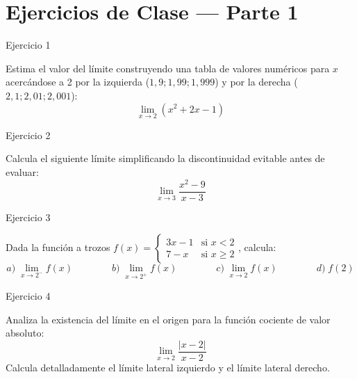 \documentclass[aspectratio=169]{beamer}
\begin{document}
\section{Ejercicios de Clase — Parte 1}

\begin{frame}{Ejercicio 1}
  \begin{mwejercicio}
    Estima el valor del límite construyendo una tabla de valores numéricos para $x$ acercándose a 2 por la izquierda ($1{,}9; 1{,}99; 1{,}999$) y por la derecha ($2{,}1; 2{,}01; 2{,}001$):
    $$\lim_{x \to 2} (x^2 + 2x - 1)$$
  \end{mwejercicio}
  \vspace{3.5cm}
\end{frame}
\begin{frame}{Ejercicio 2}
  \begin{mwejercicio}
    Calcula el siguiente límite simplificando la discontinuidad evitable antes de evaluar:
    $$\lim_{x \to 3} \frac{x^2 - 9}{x - 3}$$
  \end{mwejercicio}
  \vspace{3.5cm}
\end{frame}
\begin{frame}{Ejercicio 3}
  \begin{mwejercicio}
    Dada la función a trozos $f(x) = \begin{cases} 3x - 1 & \text{si } x < 2 \\ 7 - x & \text{si } x \ge 2 \end{cases}$, calcula:
    $$a)\; \lim_{x \to 2^-} f(x) \qquad\qquad b)\; \lim_{x \to 2^+} f(x) \qquad\qquad c)\; \lim_{x \to 2} f(x) \qquad\qquad d)\; f(2)$$
  \end{mwejercicio}
  \vspace{3.5cm}
\end{frame}
\begin{frame}{Ejercicio 4}
  \begin{mwejercicio}
    Analiza la existencia del límite en el origen para la función cociente de valor absoluto:
    $$\lim_{x \to 2} \frac{|x - 2|}{x - 2}$$
    Calcula detalladamente el límite lateral izquierdo y el límite lateral derecho.
  \end{mwejercicio}
  \vspace{3.5cm}
\end{frame}
\end{document}
